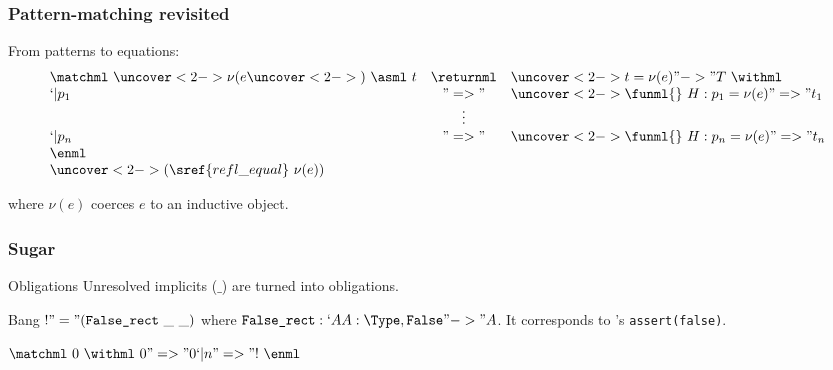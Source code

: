 \begin{frame}
  \frametitle{Pattern-matching revisited}

  From patterns to equations:
  \[ \begin{array}{lcl}
    \matchml~\uncover<2->{\nu{}(}e\uncover<2->{)~\asml~t} & \returnml & \uncover<2->{t = \nu{(e)} "->"} T~\withml \\
    `| p_1 & "=>" & \uncover<2->{\funml{}~H : p_1 = \nu{(e)} "=>"} t_1 \\
    & \vdots{} & \\
    `| p_n & "=>" & \uncover<2->{\funml{}~H : p_n = \nu{(e)} "=>"} t_n \\
    \enml & & \\
    \uncover<2->{(\sref{refl\_equal}~\nu{(e)})} & &
  \end{array}\]

  where $\nu(e)$ coerces $e$ to an inductive object.
  
\end{frame}

\begin{frame}
  \frametitle{Sugar}

  \begin{block}{Obligations}
    Unresolved implicits ($\_$) are turned into obligations.
  \end{block}
  
  \begin{block}{Bang}
    $! "=" (\texttt{False\_rect}~\_~\_)$ where $\texttt{False\_rect} : `A
    A : \Type, \texttt{False} "->" A$. It corresponds to \ML's
    \texttt{assert(false)}.
  \end{block}
  
  \begin{example}
    $\matchml~0~\withml~0 "=>" 0 `| n "=>" !~\enml$
  \end{example}
  
  

\end{frame}

